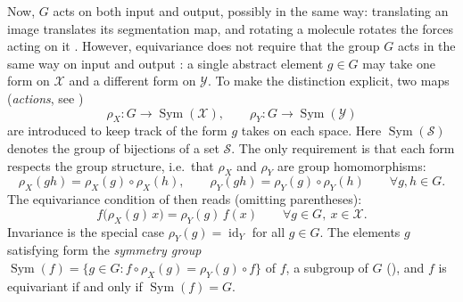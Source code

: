 \documentclass[mathematics,review,submit,moreauthors]{Definitions/mdpi}
\begin{document}
Now, $G$ acts on both input and output, possibly in the same way: translating an image translates its segmentation map, and rotating a molecule rotates the forces acting on it \citep{geiger2022,bogatskiy2020p3icml}.
However, equivariance does not require that the group $G$ acts in the same way on input and output \citep{cohen2016a,bogatskiy2020p3icml}: a single abstract element $g\in G$ may take one form on $\mathcal{X}$ and a different form on $\mathcal{Y}$.
To make the distinction explicit, two maps (\emph{actions}, see )
\[
    \rho_X : G \to \operatorname{Sym}(\mathcal{X}), \qquad \rho_Y : G \to \operatorname{Sym}(\mathcal{Y})
\]
are introduced to keep track of the form $g$ takes on each space.
Here $\operatorname{Sym}(\mathcal{S})$ denotes the group of bijections of a set $\mathcal{S}$.
The only requirement is that each form respects the group structure, i.e.\ that $\rho_X$ and $\rho_Y$ are group homomorphisms:
\begin{equation}\label{eq:representation-homomorphism}
    \rho_X(gh)=\rho_X(g)\circ\rho_X(h), \qquad \rho_Y(gh)=\rho_Y(g)\circ\rho_Y(h) \qquad \forall g, h \in G.
\end{equation}
The equivariance condition of  then reads (omitting parentheses):
\begin{equation}\label{eq:general-equivariance}
    f\big(\rho_X(g)\,x\big)=\rho_Y(g)\,f(x) \qquad \forall g\in G,\ x\in\mathcal{X}.
\end{equation}
Invariance is the special case $\rho_Y(g)=\operatorname{id}_Y$ for all $g\in G$.
The elements $g$ satisfying  form the \emph{symmetry group} $\operatorname{Sym}(f)=\{g\in G: f\circ\rho_X(g)=\rho_Y(g)\circ f\}$ of $f$, a subgroup of $G$ (), and $f$ is equivariant if and only if $\operatorname{Sym}(f)=G$.
\end{document}
